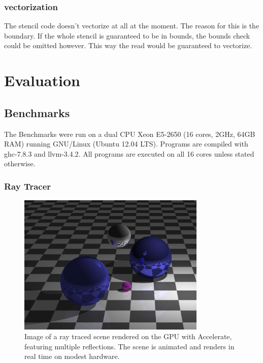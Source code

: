 \documentclass[a4paper,bibliography=totocnumbered,parskip,headsepline]{scrbook}
\begin{document}
\subsection{vectorization}
The stencil code doesn't vectorize at all at the moment.
The reason for this is the boundary.
If the whole stencil is guaranteed to be in bounds, the bounds check could be omitted however.
This way the read would be guaranteed to vectorize.

\chapter{Evaluation}

\section{Benchmarks}

The Benchmarks were run on a dual CPU Xeon E5-2650 (16 cores, 2GHz, 64GB RAM) running GNU/Linux (Ubuntu 12.04 LTS).
Programs are compiled with ghc-7.8.3 and llvm-3.4.2.
All programs are executed on all 16 cores unless stated otherwise.

\subsection{Ray Tracer}
\begin{figure}
    \centering
    \includegraphics[width=0.8\textwidth]{images/benchmarks/ray/ray_sample}
    \caption[Ray tracer]{Image of a ray traced scene rendered on the GPU with
    Accelerate, featuring multiple reflections. The scene is animated and
    renders in real time on modest hardware.}
    \label{fig:ray_sample}
\end{figure}
\end{document}
